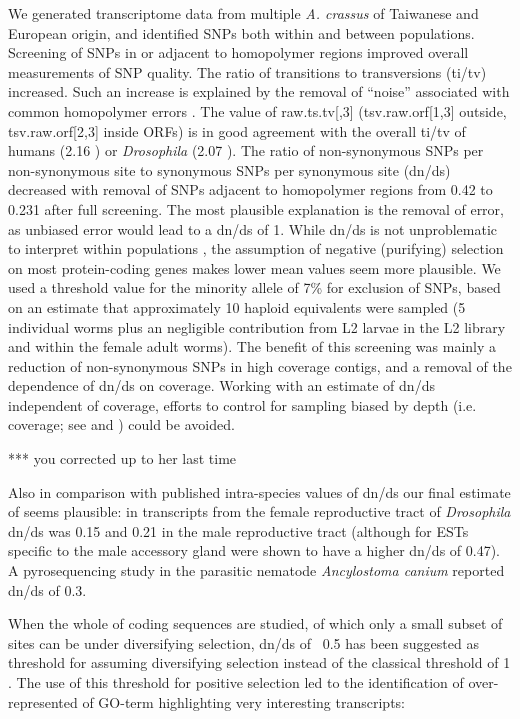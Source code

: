 \documentclass[10pt]{bmc_article}
\newenvironment{bmcformat}{\begin{raggedright}\baselineskip20pt\sloppy\setboolean{publ}{false}}{\end{raggedright}\baselineskip20pt\sloppy}
\begin{document}
\begin{bmcformat}
We generated transcriptome data from multiple \textit{A. crassus} of
Taiwanese and European origin, and identified SNPs both within and
between populations. Screening of SNPs in or adjacent to homopolymer
regions improved overall measurements of SNP quality. The ratio of
transitions to transversions (ti/tv) increased. Such an increase is
explained by the removal of “noise” associated with common homopolymer
errors \cite{pmid21685085}. The value of raw.ts.tv[,3]
(tsv.raw.orf[1,3] outside, tsv.raw.orf[2,3] inside ORFs) is in good
agreement with the overall ti/tv of humans (2.16 \cite{pmid21169219})
or \textit{Drosophila} (2.07 \cite{pmid21143862}). The ratio of
non-synonymous SNPs per non-synonymous site to synonymous SNPs per
synonymous site (dn/ds) decreased with removal of SNPs adjacent to
homopolymer regions from 0.42 to
0.231 after full screening. The most
plausible explanation is the removal of error, as unbiased error would
lead to a dn/ds of 1. While dn/ds is not unproblematic to interpret
within populations \cite{pmid19081788}, the assumption of negative
(purifying) selection on most protein-coding genes makes lower mean
values seem more plausible. We used a threshold value for the minority
allele of 7\% for exclusion of SNPs, based on an estimate that
approximately 10 haploid equivalents were sampled (5 individual worms
plus an negligible contribution from L2 larvae in the L2 library and
within the female adult worms). The benefit of this screening was
mainly a reduction of non-synonymous SNPs in high coverage contigs,
and a removal of the dependence of dn/ds on coverage. Working with an
estimate of dn/ds independent of coverage, efforts to control for
sampling biased by depth (i.e. coverage; see \cite{pmid18590545} and
\cite{pmid20478048}) could be avoided.

*** you corrected up to her last time

Also in comparison with published intra-species values of dn/ds our
final estimate of seems plausible: in transcripts from the female
reproductive tract of \textit{Drosophila} dn/ds was 0.15
\cite{pmid15579698} and 0.21 in the male reproductive tract
\cite{pmid11404480} (although for ESTs specific to the male accessory
gland were shown to have a higher dn/ds of 0.47). A pyrosequencing
study in the parasitic nematode \textit{Ancylostoma canium}
\cite{pmid20470405} reported dn/ds of 0.3.

When the whole of coding sequences are studied, of which only a small
subset of sites can be under diversifying selection, dn/ds of ~0.5 has
been suggested as threshold for assuming diversifying selection
\cite{pmid15579698} instead of the classical threshold of 1
\cite{pmid6449605}. The use of this threshold for positive selection
led to the identification of over-represented of GO-term highlighting
very interesting transcripts:


\end{bmcformat}
\end{document}
